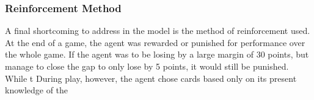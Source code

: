 
\subsubsection*{Reinforcement Method}
\label{sec:disc-shortcomints-reinforcement}

A final shortcoming to address in the model is the method of reinforcement
used.
%
At the end of a game,
the agent was rewarded or punished for performance over the whole game.
%
If the agent was to be losing by a large margin of 30 points,
but manage to close the gap to only lose by 5 points,
it would still be punished.
%
While t
%
During play,
however,
the agent chose cards based only on its present knowledge of the

